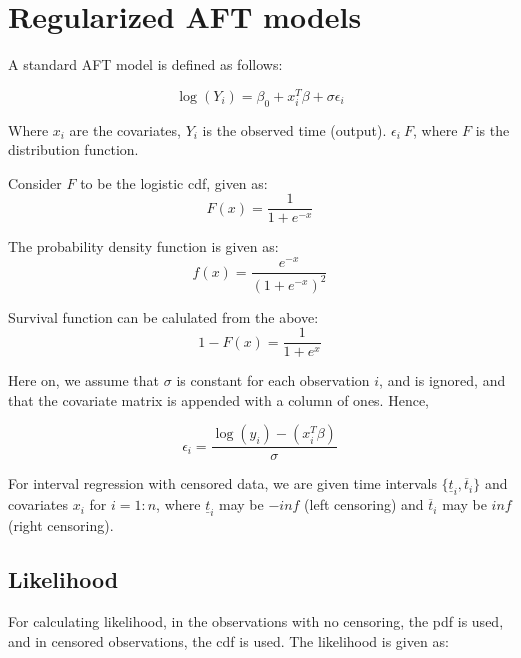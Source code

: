 \documentclass[12pt,a4paper]{report}
\begin{document}
\section{Regularized AFT models}
A standard AFT model is defined as follows:


\begin{equation}
	\log (Y_i) = \beta_0  + x_i^T \beta + \sigma \epsilon_i
\end{equation}

Where $x_i$ are the covariates, $Y_i$ is the observed time (output). $\epsilon_i ~ F$, where $F$ is the distribution function.

Consider $F$ to be the logistic cdf, given as:
\begin{equation} \label{cdf}
F(x) = \frac{1}{1 + e^{-x}}
\end{equation}

The probability density function is given as:
\begin{equation} \label{pdf}
f(x) = \frac{e^{-x}}{(1 + e^{-x})^2}
\end{equation}

Survival function can be calulated from the above:
\begin{equation} \label{survival}
1 - F(x) = \frac{1}{1 + e^{x}}
\end{equation}

Here on, we assume that $\sigma$ is constant for each observation $i$, and is ignored, and that the covariate matrix is appended with a column of ones.
Hence,

\begin{equation}
	\epsilon_i = \frac{\log (y_i) - (x_i^T \beta)} {\sigma}
\end{equation}


For interval regression with censored data, we are given time intervals $\{\underline t_i, \overline t_i\}$ and covariates $x_i$ for $i=1:n$, where $\underline t_i$ may be $-inf$
(left censoring) and $\overline t_i$ may be $inf$ (right censoring).

\subsection{Likelihood}
For calculating likelihood, in the observations with no censoring, the pdf is used, and in censored observations, the cdf is used.
The likelihood is given as:
\end{document}
